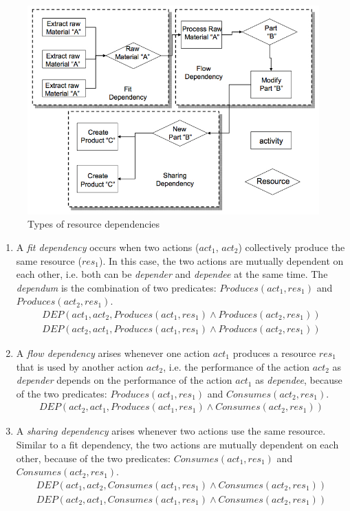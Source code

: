 \begin{figure}[htbp] %
   \centering
   \includegraphics[width=4.5in]{resource_deps.jpg} 
   \caption{Types of resource dependencies \cite{malone1994interdisciplinary}}
   \label{fig:resource_deps}
\end{figure}

\begin{enumerate}
	\item A \emph{fit dependency} occurs when two actions ($act_1$, $act_2$) collectively produce the same resource ($res_1$). In this case, the two actions  are mutually dependent on each other, i.e. both can be \emph{depender} and \emph{dependee} at the same time. The \emph{dependum} is the combination of two predicates: $Produces(act_1, res_1)$ and $Produces(act_2, res_1)$.
		\begin{align*} 
			 DEP(act_1, act_2, Produces(act_1, res_1) \land Produces(act_2, res_1))\\
			 DEP(act_2, act_1, Produces(act_1, res_1) \land Produces(act_2, res_1))
		\end{align*}
	\item A \emph{flow dependency} arises whenever one action $act_1$ produces a resource $res_1$ that is used by another action $act_2$, i.e. the performance of the action $act_2$ as \emph{depender} depends on the performance of the action $act_1$ as \emph{dependee}, because of the two predicates: $Produces(act_1, res_1)$ and $Consumes(act_2, res_1)$.
		\begin{align*} 
			 DEP(act_2, act_1, Produces(act_1, res_1) \land Consumes(act_2, res_1))
		\end{align*}
	\item A \emph{sharing dependency} arises whenever two actions use the same resource. Similar to a fit dependency, the two actions are mutually dependent on each other, because of the two predicates: $Consumes(act_1, res_1)$ and $Consumes(act_2, res_1)$.
	\begin{align*} 
		 DEP(act_1, act_2, Consumes(act_1, res_1) \land Consumes(act_2, res_1))\\
		 DEP(act_2, act_1, Consumes(act_1, res_1) \land Consumes(act_2, res_1))
	\end{align*}
\end{enumerate}

